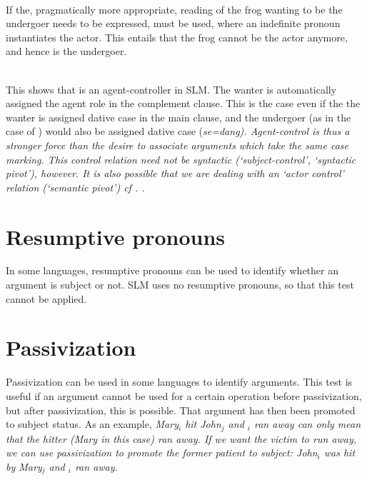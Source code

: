 \\
If the, pragmatically more appropriate, reading of the frog wanting to be the undergoer needs to be expressed,  must be used, where an indefinite pronoun  instantiates the actor. This entails that the frog cannot be the actor anymore, and hence is the undergoer.


 \\
This shows that  is an agent-controller in SLM. The wanter is automatically assigned the agent role in the complement clause. This is the case even if the the wanter is assigned dative case in the main clause, and the undergoer (as in the case of ) would also be assigned dative case (\em se=dang\em). Agent-control is thus a stronger force than the desire to associate arguments which take the same case marking. This control relation need not be syntactic (`subject-control', `syntactic pivot'), however. It is also possible that we are dealing with an `actor control' relation (`semantic pivot') cf . \citet[257]{VanValinEtAl1997}.

\section{Resumptive pronouns}\label{sec:grel:Resumptivepronouns}
In some languages, resumptive pronouns can be used to identify whether an argument is subject or not. SLM uses no resumptive pronouns, so that this test cannot be applied.

\section{Passivization}\label{sec:grel:Passivization}
Passivization can be used in some languages to identify arguments. This test is useful if an argument cannot be used for a certain operation before passivization, but after passivization, this is possible. That argument has then been promoted to subject status. As an example, \em Mary$_i$ hit John$_j$ and \zero{}$_i$ ran away \em can only mean that the hitter (\em Mary \em in this case) ran away. If we want the victim to run away, we can use passivization to promote the former patient to subject: \em John$_i$  was hit by Mary$_j$ and \zero{}$_i$ ran away\em.

